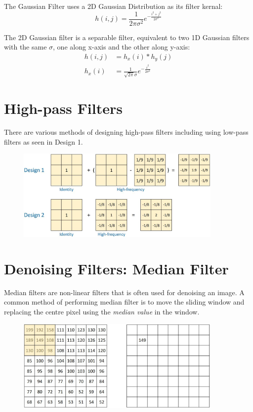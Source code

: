 \documentclass{report}
\begin{document}
The Gaussian Filter uses a 2D Gaussian Distribution as its filter kernal:
$$
    h(i,j) = \frac{1}{2\pi \sigma^2} e^{- \frac{i^2 + j^2}{2\sigma^2}}
$$

The 2D Gaussian filter is a separable filter, equivalent to two 1D Gaussian
filters with the same $\sigma$, one along x-axis and the other along y-axis:
\begin{align*}
    h(i,j) &= h_x(i) * h_y(j) \\
    h_x(i) &= \frac{1}{\sqrt{2\pi}\sigma}e^{-\frac{i^2}{2\sigma^2}}
\end{align*}

\section{High-pass Filters}

There are various methods of designing high-pass filters including using
low-pass filters as seen in Design 1.
\begin{figure}[h]
    \centering
    \includegraphics[width=10cm]{High pass.JPG}
\end{figure}

\section{Denoising Filters: Median Filter}

Median filters are non-linear filters that is often used for denoising an image.
A common method of performing median filter is to move the sliding window and
replacing the centre pixel using the \textit{median value} in the window.
\begin{figure}[h]
    \centering
    \includegraphics[width=10cm]{Median filter.JPG}
\end{figure}
\end{document}
